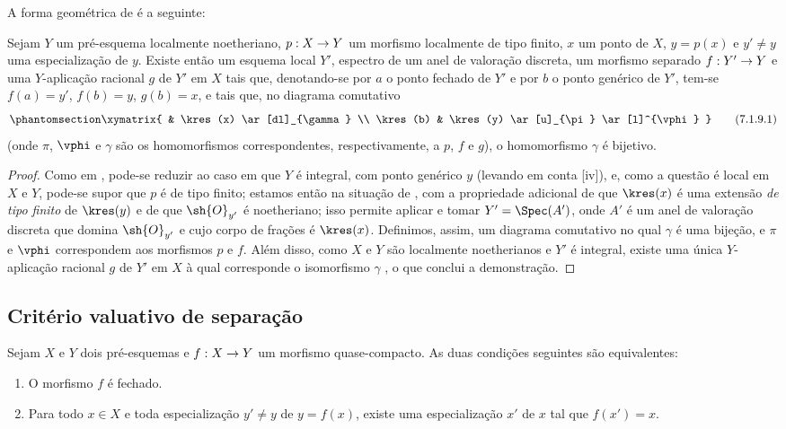 \documentclass[oneside,10pt]{amsart}
\makeatletter
\newcommand{\ega@arrow}[2]{\mathchoice{#1}{#2}{#2}{#2}}
\renewcommand{\to}{\ega@arrow{\longrightarrow}{\rightarrow}}
\newcommand{\oldpage}[2][]{\marginnote{\normalfont\footnotesize\textbf{#1}~|~#2}\ignorespaces}
\let\EGAOriginalLabel\label
\renewcommand{\label}[1]{\phantomsection\EGAOriginalLabel{#1}}
\makeatother
\begin{document}
A forma geométrica de  é a seguinte:
\oldpage[II]{141}
\begin{proposition}[7.1.9]
\label{II.7.1.9}
Sejam $Y$ um pré-esquema localmente noetheriano, $p:X\to Y$ um morfismo localmente de tipo finito, $x$ um ponto de $X$, $y=p(x)$ e $y'\neq y$ uma especialização de $y$.
Existe então um esquema local $Y'$, espectro de um anel de valoração discreta, um morfismo separado $f:Y'\to Y$ e uma $Y$-aplicação racional $g$ de $Y'$ em $X$ tais que, denotando-se por $a$ o ponto fechado de $Y'$ e por $b$ o ponto genérico de $Y'$, tem-se $f(a)=y'$, $f(b)=y$, $g(b)=x$, e tais que, no diagrama comutativo
\[
\label{II.7.1.9.1}
    \xymatrix{
        & \kres(x) \ar[dl]_{\gamma}
    \\  \kres(b)
        & \kres(y) \ar[u]_{\pi} \ar[l]^{\vphi}
    }
\tag{7.1.9.1}
\]
(onde $\pi$, $\vphi$ e $\gamma$ são os homomorfismos correspondentes, respectivamente, a $p$, $f$ e $g$), o homomorfismo $\gamma$ é bijetivo.
\end{proposition}

\begin{proof}
Como em , pode-se reduzir ao caso em que $Y$ é integral, com ponto genérico $y$ (levando em conta [iv]), e, como a questão é local em $X$ e $Y$, pode-se supor que $p$ é de tipo finito;
estamos então na situação de , com a propriedade adicional de que $\kres(x)$ é uma extensão \emph{de tipo finito} de $\kres(y)$  e de que $\sh{O}_{y'}$ é noetheriano;
isso permite aplicar  e tomar $Y'=\Spec(A')$, onde $A'$ é um anel de valoração discreta que domina $\sh{O}_{y'}$ e cujo corpo de frações é $\kres(x)$.
Definimos, assim, um diagrama comutativo  no qual $\gamma$ é uma bijeção, e $\pi$ e $\vphi$ correspondem aos morfismos $p$ e $f$.
Além disso, como $X$ e $Y$ são localmente noetherianos  e $Y'$ é integral, existe uma única $Y$-aplicação racional $g$ de $Y'$ em $X$ à qual corresponde o isomorfismo $\gamma$ , o que conclui a demonstração.
\end{proof}

\subsection{Critério valuativo de separação}
\label{subsection:II.7.2}

\begin{proposition}[7.2.1]
\label{II.7.2.1}
Sejam $X$ e $Y$ dois pré-esquemas e $f:X\to Y$ um morfismo quase-compacto.
As duas condições seguintes são equivalentes:
\begin{enumerate}
    \item[\rm{(a)}] O morfismo $f$ é fechado.
    \item[\rm{(b)}] Para todo $x\in X$ e toda especialização $y'\neq y$ de $y=f(x)$, existe uma especialização $x'$ de $x$ tal que $f(x')=x$.
\end{enumerate}
\end{proposition}
\end{document}
